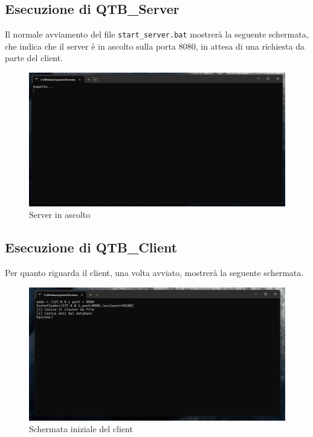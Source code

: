 \subsection{Esecuzione di QTB\_Server}


Il normale avviamento del file \texttt{start\_server.bat} mostrerà la seguente schermata, che indica che il server è in ascolto sulla porta 8080, in attesa di una richiesta da parte del client.

\begin{figure}[h!]
    \centering
    \includegraphics[width = 0.5 \textwidth]{images/normale funzionamento del server.png}
    \caption{Server in ascolto}
    
\end{figure}

\subsection{Esecuzione di QTB\_Client}

Per quanto riguarda il client, una volta avviato, mostrerà la seguente schermata.

\begin{figure}[h!]
    \centering
    \includegraphics[width = 0.5 \textwidth]{images/normale funzionamento lcient.png}
    \caption{Schermata iniziale del client}
    
\end{figure}


